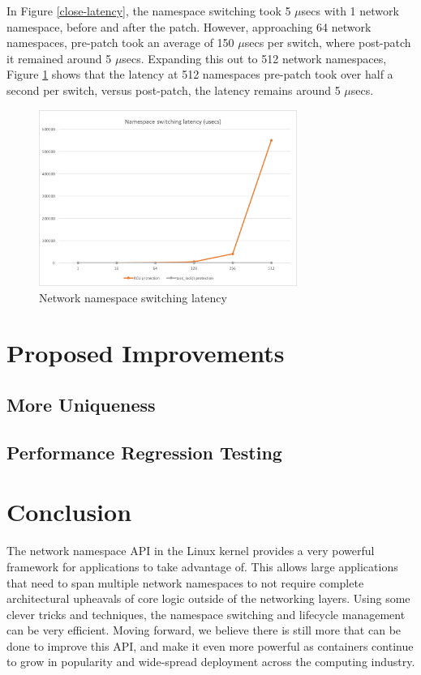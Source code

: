 \documentclass[letterpaper]{article}
\begin{document}
In Figure \ref{close-latency}, the namespace switching took 5 $\mu$secs with 1 network namespace, before and after the patch. However, approaching 64 network namespaces, pre-patch took an average of 150 $\mu$secs per switch, where post-patch it remained around 5 $\mu$secs. Expanding this out to 512 network namespaces, Figure \ref{full-latency} shows that the latency at 512 namespaces pre-patch took over half a second per switch, versus post-patch, the latency remains around 5 $\mu$secs.

\begin{figure}[h]
\includegraphics[width=3.31in]{full-namespace-latency.png}
\caption{Network namespace switching latency}
\label{full-latency}
\end{figure}

\section{Proposed Improvements}

\subsection{More Uniqueness}

\subsection{Performance Regression Testing}

\section{Conclusion}
The network namespace API in the Linux kernel provides a very powerful framework for applications to take advantage of. This allows large applications that need to span multiple network namespaces to not require complete architectural upheavals of core logic outside of the networking layers. Using some clever tricks and techniques, the namespace switching and lifecycle management can be very efficient. Moving forward, we believe there is still more that can be done to improve this API, and make it even more powerful as containers continue to grow in popularity and wide-spread deployment across the computing industry.
\end{document}
